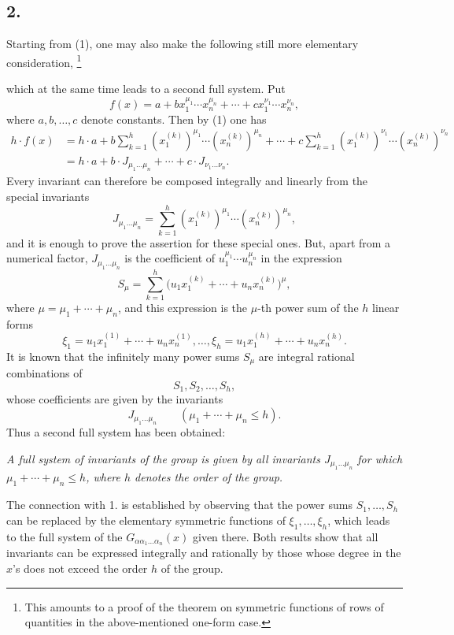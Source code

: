 \documentclass[11pt]{article}
\providecommand{\NoetherSrcNote}[2]{%
  \begingroup
  \renewcommand{\thefootnote}{#1}%
  \footnote{#2}%
  \addtocounter{footnote}{-1}%
  \endgroup}
\begin{document}
\subsection*{2.}
Starting from (1), one may also make the following still more elementary consideration,\NoetherSrcNote{**)}{This amounts to a proof of the theorem on symmetric functions of rows of quantities in the above-mentioned one-form case.} which at the same time leads to a second full system. Put
\[
  f(x)=a+b x_1^{\mu_1}\cdots x_n^{\mu_n}
       +\cdots+c x_1^{\nu_1}\cdots x_n^{\nu_n},
\]
where $a,b,\ldots,c$ denote constants. Then by (1) one has
\[
\begin{aligned}
 h\cdot f(x)
 &=h\cdot a+b\sum_{k=1}^{h}(x_1^{(k)})^{\mu_1}\cdots(x_n^{(k)})^{\mu_n}
     +\cdots
     +c\sum_{k=1}^{h}(x_1^{(k)})^{\nu_1}\cdots(x_n^{(k)})^{\nu_n} \\
 &=h\cdot a+b\cdot J_{\mu_1\ldots\mu_n}+\cdots+c\cdot J_{\nu_1\ldots\nu_n}.
\end{aligned}
\]
Every invariant can therefore be composed integrally and linearly from the special invariants
\[
  J_{\mu_1\ldots\mu_n}
  =\sum_{k=1}^{h}(x_1^{(k)})^{\mu_1}\cdots(x_n^{(k)})^{\mu_n},
\]
and it is enough to prove the assertion for these special ones. But, apart from a numerical factor, $J_{\mu_1\ldots\mu_n}$ is the coefficient of $u_1^{\mu_1}
\cdots u_n^{\mu_n}$ in the expression
\[
  S_\mu=\sum_{k=1}^{h}
  \bigl(u_1x_1^{(k)}+\cdots+u_nx_n^{(k)}\bigr)^{\mu},
\]
where $\mu=\mu_1+\cdots+\mu_n$, and this expression is the $\mu$-th power sum of the $h$ linear forms
\[
  \xi_1=u_1x_1^{(1)}+\cdots+u_nx_n^{(1)},\ldots,
  \xi_h=u_1x_1^{(h)}+\cdots+u_nx_n^{(h)}.
\]
It is known that the infinitely many power sums $S_\mu$ are integral rational combinations of
\[
  S_1,S_2,\ldots,S_h,
\]
whose coefficients are given by the invariants
\[
  J_{\mu_1\ldots\mu_n}\qquad(\mu_1+\cdots+\mu_n\le h).
\]
Thus a second full system has been obtained:

\emph{A full system of invariants of the group is given by all invariants $J_{\mu_1\ldots\mu_n}$ for which $\mu_1+\cdots+\mu_n\le h$, where $h$ denotes the order of the group.}

The connection with 1. is established by observing that the power sums $S_1,
\ldots,S_h$ can be replaced by the elementary symmetric functions of $\xi_1,
\ldots,
\xi_h$, which leads to the full system of the $G_{\alpha\alpha_1\ldots\alpha_n}(x)$ given there. Both results show that all invariants can be expressed integrally and rationally by those whose degree in the $x$'s does not exceed the order $h$ of the group.
\end{document}
